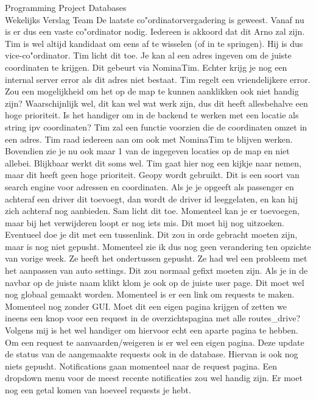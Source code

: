 \documentclass{article}
\newcounter{team}
\begin{document}
\begin{Minutes}{Programming Project Databases \\ Wekelijks Verslag Team }
				    De laatste co"ordinatorvergadering is geweest. Vanaf nu is er dus een vaste co"ordinator nodig. Iedereen is akkoord dat dit Arno zal zijn. Tim is wel altijd kandidaat om eens af te wisselen (of in te springen). Hij is dus vice-co"ordinator.
				    Tim licht dit toe. Je kan al een adres ingeven om de juiste coordinaten te krijgen. Dit gebeurt via NominaTim. Echter krijg je nog een internal server error als dit adres niet bestaat. Tim regelt een vriendelijkere error. Zou een mogelijkheid om het op de map te kunnen aanklikken ook niet handig zijn? Waarschijnlijk wel, dit kan wel wat werk zijn, dus dit heeft allesbehalve een hoge prioriteit. Is het handiger om in de backend te werken met een locatie als string ipv coordinaten? Tim zal een functie voorzien die de coordinaten omzet in een adres. Tim raad iedereen aan om ook met NominaTim te blijven werken. Bovendien zie je nu ook maar 1 van de ingegeven locaties op de map en niet allebei. Blijkbaar werkt dit soms wel. Tim gaat hier nog een kijkje naar nemen, maar dit heeft geen hoge prioriteit. Geopy wordt gebruikt. Dit is een soort van search engine voor adressen en coordinaten. Als je je opgeeft als passenger en achteraf een driver dit toevoegt, dan wordt de driver id leeggelaten, en kan hij zich achteraf nog aanbieden.
			        Sam licht dit toe. Momenteel kan je er toevoegen, maar bij het verwijderen loopt er nog iets mis. Dit moet hij nog uitzoeken. Eventueel doe je dit met een tussenlink.
			        Dit zou in orde gebracht moeten zijn, maar is nog niet gepusht. Momenteel zie ik dus nog geen verandering ten opzichte van vorige week. Ze heeft het ondertussen gepusht. Ze had wel een probleem met het aanpassen van auto settings. Dit zou normaal gefixt moeten zijn. Als je in de navbar op de juiste naam klikt klom je ook op de juiste user page. Dit moet wel nog globaal gemaakt worden.
					Momenteel is er een link om requests te maken. Momenteel nog zonder GUI. Moet dit een eigen pagina krijgen of zetten we ineens een knop voor een request in de overzichtspagina met alle routes_drive? Volgens mij is het wel handiger om hiervoor echt een aparte pagina te hebben.
					Om een request te aanvaarden/weigeren is er wel een eigen pagina. Deze update de status van de aangemaakte requests ook in de database.
				    Hiervan is ook nog niets gepusht. Notifications gaan momenteel naar de request pagina. Een dropdown menu voor de meest recente notificaties zou wel handig zijn. Er moet nog een getal komen van hoeveel requests je hebt.

\end{Minutes}
\end{document}
